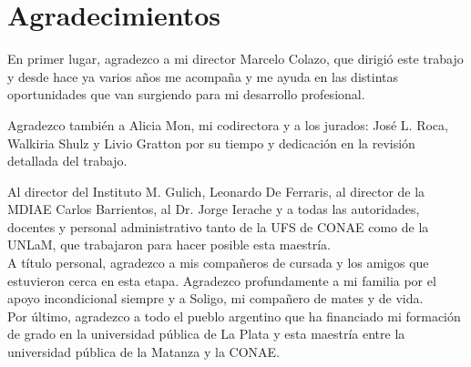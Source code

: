 \chapter*{Agradecimientos}
\label{chap:agradecimientos}

En primer lugar, agradezco a mi director Marcelo Colazo, que dirigi\'o este trabajo y desde hace ya varios a\~nos me acompa\~na y me ayuda en las distintas oportunidades que van surgiendo para mi desarrollo profesional. 

Agradezco tambi\'en a Alicia Mon, mi codirectora y a los jurados: Jos\'e L. Roca, Walkiria Shulz y Livio Gratton por su tiempo y dedicaci\'on en la revisi\'on detallada del trabajo. 

Al director del Instituto M. Gulich, Leonardo De Ferraris, al director de la MDIAE Carlos Barrientos, al Dr. Jorge Ierache y a todas las autoridades, docentes y personal administrativo tanto de la UFS de CONAE como de la UNLaM, que trabajaron para hacer posible esta maestr\'ia.\\


A t\'itulo personal, agradezco a mis compa\~neros de cursada y los amigos que estuvieron cerca en esta etapa. Agradezco profundamente a mi familia por el apoyo incondicional siempre y a Soligo, mi compa\~nero de mates y de vida.\\


Por \'ultimo, agradezco a todo el pueblo argentino que ha financiado mi formaci\'on de grado en la universidad pública de La Plata y esta maestr\'ia entre la universidad p\'ublica de la Matanza y la CONAE. 





